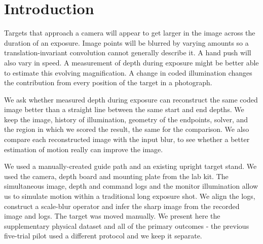 \section{Introduction}
Targets that approach a camera will appear to get larger in the image across the duration of an exposure. Image points will be blurred by varying amounts so a translation-invariant convolution cannot generally describe it. A hand push will also vary in speed. A measurement of depth during exposure might be better able to estimate this evolving magnification. A change in coded illumination changes the contribution from every position of the target in a photograph.

We ask whether measured depth during exposure can reconstruct the same coded image better than a straight line between the same start and end depths. We keep the image, history of illumination, geometry of the endpoints, solver, and the region in which we scored the result, the same for the comparison. We also compare each reconstructed image with the input blur, to see whether a better estimation of motion really can improve the image.

We used a manually-created guide path and an existing upright target stand. We used the camera, depth board and mounting plate from the lab kit. The simultaneous image, depth and command logs and the monitor illumination allow us to simulate motion within a traditional long exposure shot. We align the logs, construct a scale-blur operator and infer the sharp image from the recorded image and logs. The target was moved manually. We present here the supplementary physical dataset and all of the primary outcomes - the previous five-trial pilot used a different protocol and we keep it separate.
